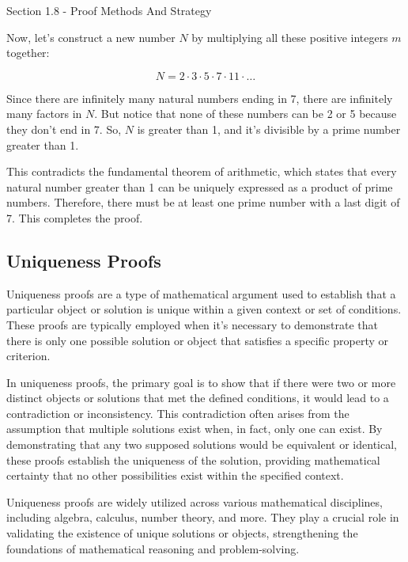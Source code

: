 \begin{notes}{Section 1.8 - Proof Methods And Strategy}
\begin{highlight}
        Now, let's construct a new number \(N\) by multiplying all these positive integers \(m\) together:
        
        \[N = 2 \cdot 3 \cdot 5 \cdot 7 \cdot 11 \cdot \ldots\]
    
    
        Since there are infinitely many natural numbers ending in 7, there are infinitely many factors in \(N\). But notice that none of these numbers can be 2 or 5 because they don't end in 7. So, \(N\) is greater than 
        1, and it's divisible by a prime number greater than 1. 
    
        This contradicts the fundamental theorem of arithmetic, which states that every natural number greater than 1 can be uniquely expressed as a product of prime numbers. Therefore, there must be at least one prime 
        number with a last digit of 7. This completes the proof.
    \end{highlight}
    
    \subsection*{Uniqueness Proofs}

    Uniqueness proofs are a type of mathematical argument used to establish that a particular object or solution is unique within a given context or set of conditions. These proofs are typically employed when it's necessary 
    to demonstrate that there is only one possible solution or object that satisfies a specific property or criterion.

    In uniqueness proofs, the primary goal is to show that if there were two or more distinct objects or solutions that met the defined conditions, it would lead to a contradiction or inconsistency. This contradiction often 
    arises from the assumption that multiple solutions exist when, in fact, only one can exist. By demonstrating that any two supposed solutions would be equivalent or identical, these proofs establish the uniqueness of the 
    solution, providing mathematical certainty that no other possibilities exist within the specified context.

    Uniqueness proofs are widely utilized across various mathematical disciplines, including algebra, calculus, number theory, and more. They play a crucial role in validating the existence of unique solutions or objects, 
    strengthening the foundations of mathematical reasoning and problem-solving.


\end{notes}
